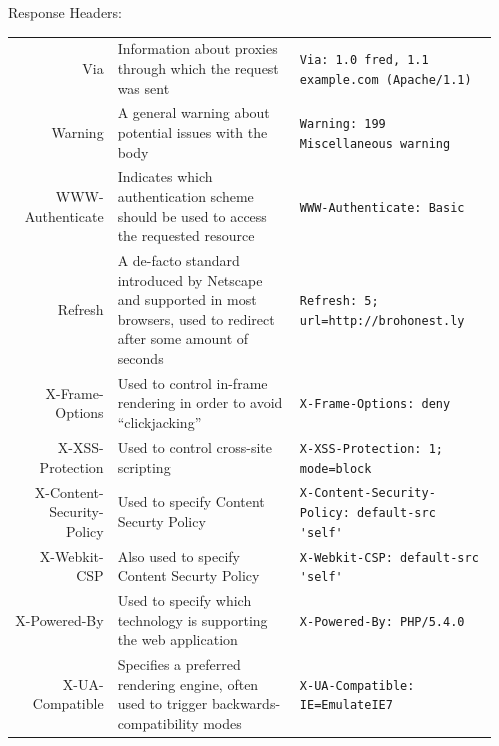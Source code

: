\documentclass[final]{beamer}
\newcommand{\header}[1]{\texttt{\lstinline!#1!}}
\begin{document}
\begin{frame}{}
\begin{columns}
\begin{column}{0.4\textwidth}
\begin{block}{\huge{Response Headers:}}
\begin{tabular}{r p{} p{}}
            Via & Information about proxies through which the request was sent & \header{Via: 1.0 fred, 1.1 example.com (Apache/1.1) } \\
            Warning & A general warning about potential issues with the body & \header{Warning: 199 Miscellaneous warning } \\
            WWW-Authenticate & Indicates which authentication scheme should be used to access the requested resource & \header{WWW-Authenticate: Basic } \\ \hline
            Refresh & A de-facto standard introduced by Netscape and supported in most browsers, used to redirect after some amount of seconds & \header{Refresh: 5; url=http://brohonest.ly } \\
            X-Frame-Options & Used to control in-frame rendering in order to avoid ``clickjacking'' & \header{X-Frame-Options: deny } \\
            X-XSS-Protection & Used to control cross-site scripting & \header{X-XSS-Protection: 1; mode=block } \\
            X-Content-Security-Policy & Used to specify Content Securty Policy & \header{X-Content-Security-Policy: default-src 'self' } \\
            X-Webkit-CSP & Also used to specify Content Securty Policy & \header{X-Webkit-CSP: default-src 'self' } \\
            X-Powered-By & Used to specify which technology is supporting the web application & \header{X-Powered-By: PHP/5.4.0 } \\
            X-UA-Compatible & Specifies a preferred rendering engine, often used to trigger backwards-compatibility modes & \header{X-UA-Compatible: IE=EmulateIE7 } \\
          \end{tabular}

        \end{block}
      \end{column}
      \begin{column}{0.1\textwidth}
      \end{column}
    \end{columns}
  \end{frame}
\end{document}
